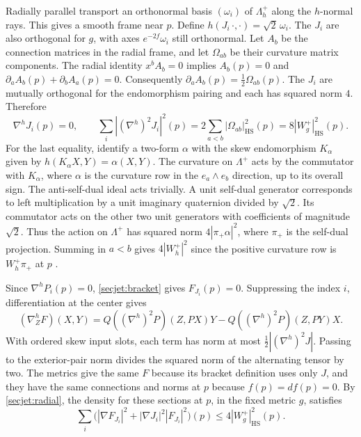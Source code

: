 \documentclass[11pt]{article}
\numberwithin{equation}{section}
\theoremstyle{definition}
\theoremstyle{remark}
\begin{document}
Radially parallel transport an orthonormal basis \((\omega_i)\) of
\(\Lambda^+_h\) along the \(h\)-normal rays. This gives a smooth frame
near \(p\). Define \(h(J_i\,\cdot,\cdot)=\sqrt2\,\omega_i\). The
\(J_i\) are also orthogonal for \(g\), with axes \(e^{-2f}\omega_i\)
still orthonormal. Let \(A_b\) be the connection matrices in the radial
frame, and let \(\Omega_{ab}\) be their curvature matrix components.
The radial identity \(x^b A_b=0\) implies
\(A_b(p)=0\) and
\(\partial_a A_b(p)+\partial_b A_a(p)=0\).
Consequently \(\partial_a A_b(p)=\tfrac12\Omega_{ab}(p)\).
The \(J_i\) are mutually orthogonal for the endomorphism pairing
and each has squared norm \(4\). Therefore
\begin{equation}
 \label{secjet:radial}
 \nabla^h J_i(p)=0,\qquad
 \sum_i |(\nabla^h)^2J_i|^2(p)
       =2\sum_{a<b}|\Omega_{ab}|_{\mathrm{HS}}^2(p)
       =8|W_g^+|_{\mathrm{HS}}^2(p).
\end{equation}
For the last equality, identify a two-form \(\alpha\) with the skew
endomorphism \(K_\alpha\) given by \(h(K_\alpha X,Y)=\alpha(X,Y)\).
The curvature on \(\Lambda^+\) acts by the commutator with
\(K_\alpha\), where \(\alpha\) is the curvature row in the
\(e_a\wedge e_b\) direction, up to its overall sign. The
anti-self-dual ideal acts trivially. A unit self-dual generator
corresponds to left multiplication by a unit imaginary quaternion
divided by \(\sqrt2\). Its commutator acts on the other two unit
generators with coefficients of magnitude \(\sqrt2\). Thus the
action on \(\Lambda^+\) has squared norm \(4|\pi_+\alpha|^2\),
where \(\pi_+\) is the self-dual projection. Summing in \(a<b\)
gives \(4|W_h^+|^2\) since the positive curvature row is
\(W_h^+\pi_+\) at \(p\)
\cite[\S1, pp.~427--429]{AHS1978}.

Since \(\nabla^hP_i(p)=0\), \eqref{secjet:bracket} gives \(F_{J_i}(p)=0\).
Suppressing the index \(i\), differentiation at the center gives
\[
 (\nabla^h_ZF)(X,Y)
   =Q((\nabla^h)^2P)(Z,PX)Y-Q((\nabla^h)^2P)(Z,PY)X .
\]
With ordered skew input slots, each term has norm at most
\(\tfrac12|(\nabla^h)^2J|\). Passing to the exterior-pair
norm divides the squared norm of the alternating tensor by two.
The metrics give the same \(F\) because its bracket definition uses
only \(J\), and they have the same connections and norms at \(p\)
because \(f(p)=df(p)=0\). By \eqref{secjet:radial}, the density for
these sections at \(p\), in the fixed metric \(g\), satisfies
\begin{equation}
 \label{secjet:center}
 \sum_i\bigl(|\nabla F_{J_i}|^2+|\nabla J_i|^2|F_{J_i}|^2\bigr)(p)
      \le 4|W_g^+|_{\mathrm{HS}}^2(p).
\end{equation}
\end{document}

